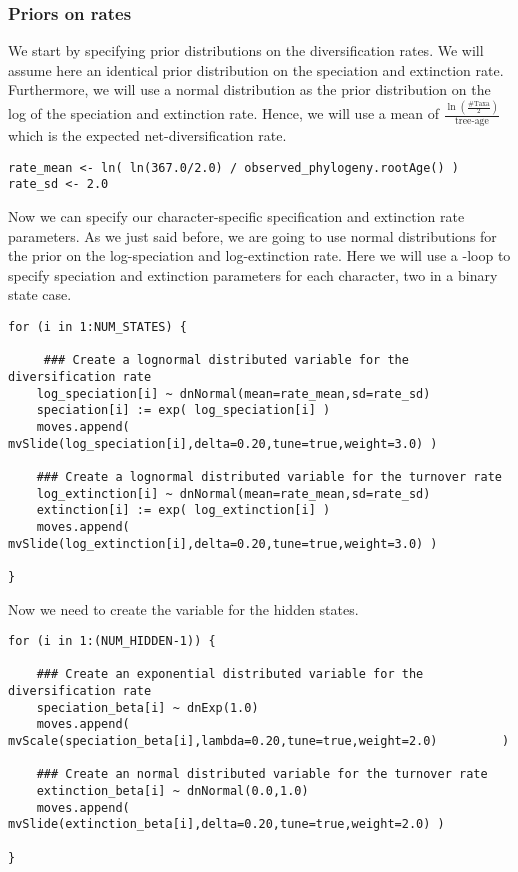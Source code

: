 \subsubsection{Priors on rates}
We start by specifying prior distributions on the diversification rates.
We will assume here an identical prior distribution on the speciation and extinction rate.
Furthermore, we will use a normal distribution as the prior distribution on the log of the speciation and extinction rate.
Hence, we will use a mean of $\frac{\ln(\frac{\text{\#Taxa}}{2})}{\text{tree-age}}$ which is the expected net-diversification rate.
{\tt \begin{snugshade*}
\begin{lstlisting}
rate_mean <- ln( ln(367.0/2.0) / observed_phylogeny.rootAge() )
rate_sd <- 2.0
\end{lstlisting}
\end{snugshade*}}
Now we can specify our character-specific specification and extinction rate parameters.
As we just said before, we are going to use normal distributions for the prior on the log-speciation and log-extinction rate.
Here we will use a -loop to specify speciation and extinction parameters for each character, \EG two in a binary state case.
{\tt \begin{snugshade*}
\begin{lstlisting}
for (i in 1:NUM_STATES) {
    
     ### Create a lognormal distributed variable for the diversification rate
    log_speciation[i] ~ dnNormal(mean=rate_mean,sd=rate_sd) 
    speciation[i] := exp( log_speciation[i] )
    moves.append( mvSlide(log_speciation[i],delta=0.20,tune=true,weight=3.0) )

    ### Create a lognormal distributed variable for the turnover rate
    log_extinction[i] ~ dnNormal(mean=rate_mean,sd=rate_sd) 
    extinction[i] := exp( log_extinction[i] )
    moves.append( mvSlide(log_extinction[i],delta=0.20,tune=true,weight=3.0) )

}
\end{lstlisting}
\end{snugshade*}}
Now we need to create the variable for the hidden states.
{\tt \begin{snugshade*}
\begin{lstlisting}
for (i in 1:(NUM_HIDDEN-1)) {
    
    ### Create an exponential distributed variable for the diversification rate
    speciation_beta[i] ~ dnExp(1.0) 
    moves.append( mvScale(speciation_beta[i],lambda=0.20,tune=true,weight=2.0)         )

    ### Create an normal distributed variable for the turnover rate
    extinction_beta[i] ~ dnNormal(0.0,1.0)
    moves.append( mvSlide(extinction_beta[i],delta=0.20,tune=true,weight=2.0) )
    
}
\end{lstlisting}
\end{snugshade*}}
